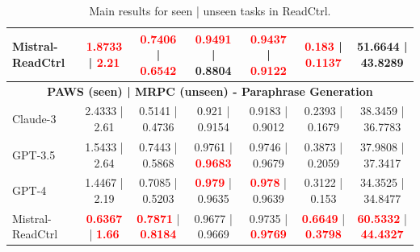 \documentclass[11pt]{article}
\begin{document}
\begin{table}[h!]
{\begin{tabular}{lcccccc}
Mistral-ReadCtrl &  \textcolor{red}{\textbf{1.8733}} | \textcolor{red}{\textbf{2.21}} & \textcolor{red}{\textbf{0.7406}} | \textcolor{red}{\textbf{0.6542}} & \textcolor{red}{\textbf{0.9491}} | 0.8804 & \textcolor{red}{\textbf{0.9437}} | \textcolor{red}{\textbf{0.9122}} & \textcolor{red}{\textbf{0.183}} | \textcolor{red}{\textbf{0.1137}} & 51.6644 | 43.8289 \\
\hline




\multicolumn{7}{c}{\textbf{PAWS (seen) | MRPC (unseen) - Paraphrase Generation}} \\
Claude-3 &  2.4333 | 2.61 & 0.5141 | 0.4736 & 0.921 | 0.9154 & 0.9183 | 0.9012 & 0.2393 | 0.1679 & 38.3459 | 36.7783 \\

GPT-3.5 & 1.5433 | 2.64 & 0.7443 | 0.5868 & 0.9761 | \textcolor{red}{\textbf{0.9683}} & 0.9746 | 0.9679 & 0.3873 | 0.2059 & 37.9808 | 37.3417 \\

GPT-4 & 1.4467 | 2.19 & 0.7085 | 0.5203 & \textcolor{red}{\textbf{0.979}} | 0.9635 & \textcolor{red}{\textbf{0.978}} | 0.9639 & 0.3122 | 0.153 & 34.3525 | 34.8477 \\

Mistral-ReadCtrl & \textcolor{red}{\textbf{0.6367}} | \textcolor{red}{\textbf{1.66}} & \textcolor{red}{\textbf{0.7871}} | \textcolor{red}{\textbf{0.8184}} & 0.9677 | 0.9669 & 0.9735 | \textcolor{red}{\textbf{0.9769}} & \textcolor{red}{\textbf{0.6649}} | \textcolor{red}{\textbf{0.3798}} & \textcolor{red}{\textbf{60.5332}} | \textcolor{red}{\textbf{44.4327}} \\
\hline
\end{tabular}}
\vspace{-2mm}
\caption{Main results for seen | unseen tasks in ReadCtrl.}
\vspace{-4mm}
\label{tab:seen_unseen}
\end{table}





\end{document}
